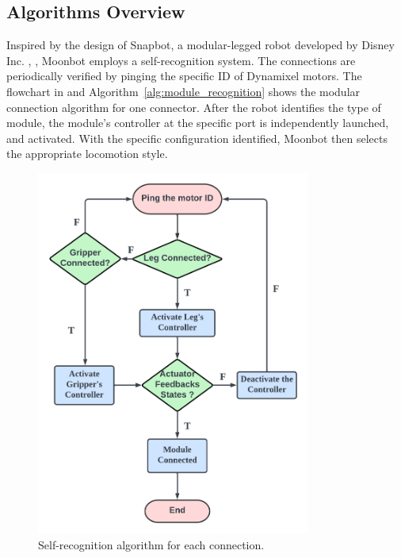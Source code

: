 \subsection{Algorithms Overview}
Inspired by the design of Snapbot, a modular-legged robot developed by Disney Inc. \cite{snapbot1}, \cite{snapbot2}, Moonbot employs a self-recognition system. The connections are periodically verified by pinging the specific ID of Dynamixel motors. The flowchart in  and Algorithm~\ref{alg:module_recognition} shows the modular connection algorithm for one connector. After the robot identifies the type of module, the module's controller at the specific port is independently launched, and activated. With the specific configuration identified, Moonbot then selects the appropriate locomotion style.
\vspace{1mm}

\begin{figure}[h]
  \centering
  \includegraphics[width=90mm]{./fig/flowchart/flowchartcolor.png}
  \vspace{2mm}
  \caption{Self-recognition algorithm for each connection.}\label{flowchart}
\end{figure}

